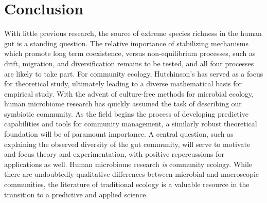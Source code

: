 \documentclass[12pt]{article}
\begin{document}
\section{Conclusion}
With little previous research, the source of extreme species richness
in the human gut is a standing question.
The relative importance of stabilizing mechanisms which promote
long term coexistence, versus non-equilibrium processes, such as
drift, migration, and  diversification remains to be tested,
and all four processes are likely to take part.
For community ecology, Hutchinson's  has
served as a focus for theoretical study,
ultimately leading to a diverse mathematical basis for empirical
study.
With the advent of culture-free methods for microbial ecology,
human microbiome research has quickly assumed the task of describing
our symbiotic community.
As the field begins the process of developing predictive capabilities
and tools for community management,
a similarly robust theoretical foundation will be of paramount
importance.
A central question, such as explaining the observed
diversity of the gut community, will serve to motivate and focus
theory and experimentation, with positive repercussions for
applications as well.
Human microbiome research \emph{is} community ecology.
While there are undoubtedly qualitative differences between
microbial and macroscopic communities, the literature of traditional
ecology is a valuable resource in the transition to a predictive
and applied science.



\end{document}
